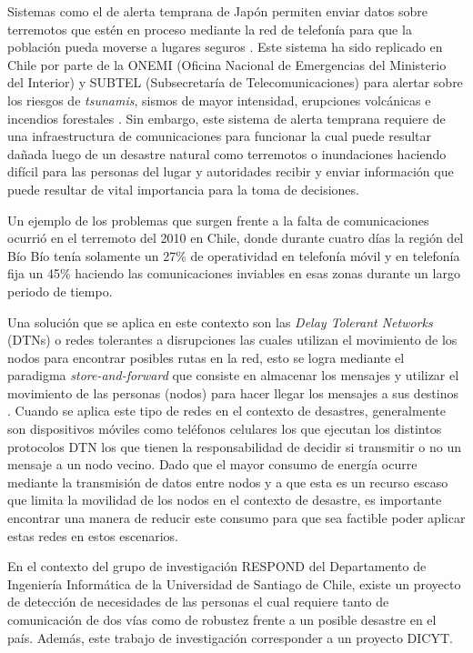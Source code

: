

Sistemas como el de alerta temprana de Japón permiten enviar datos sobre
terremotos que estén en proceso mediante la red de telefonía para que la
población pueda moverse a lugares seguros \cite{erika_yamasaki_what_2012}. Este
sistema ha sido replicado en Chile por parte de la ONEMI (Oficina Nacional de
Emergencias del Ministerio del Interior) y SUBTEL (Subsecretaría de
Telecomunicaciones) para alertar sobre los riesgos de \textit{tsunamis}, sismos
de mayor intensidad, erupciones volcánicas e incendios forestales
\cite{gobierno_de_chile_sistema_????, subtel_onemi_2014}.  Sin embargo, este
sistema de alerta temprana requiere de una infraestructura de comunicaciones
para funcionar la cual puede resultar dañada luego de un desastre natural como
terremotos o inundaciones haciendo difícil para las personas del lugar y
autoridades recibir y enviar información que puede resultar de vital importancia
para la toma de decisiones.

Un ejemplo de los problemas que surgen frente a la falta de comunicaciones
ocurrió en el terremoto del 2010 en Chile, donde durante cuatro días la región
del Bío Bío tenía solamente un 27\% de operatividad en telefonía móvil y en
telefonía fija un 45\%  \cite{subtel_reporte_2015} haciendo las comunicaciones
inviables en esas zonas durante un largo periodo de tiempo.


Una solución que se aplica en este contexto son las \textit{Delay Tolerant
Networks} (DTNs) o redes tolerantes a disrupciones las cuales utilizan el
movimiento de los nodos para encontrar posibles rutas en la red, esto se logra
mediante el paradigma \textit{store-and-forward}  que consiste en almacenar los
mensajes y utilizar el movimiento de las personas (nodos) para hacer llegar los
mensajes a sus destinos \cite{fall_delay-tolerant_2003}. Cuando se aplica este
tipo de redes en el contexto de desastres, generalmente son dispositivos móviles
como teléfonos celulares los que ejecutan los distintos protocolos DTN los que
tienen la responsabilidad de decidir si transmitir o no un mensaje a un nodo
vecino.  Dado que el mayor consumo de energía ocurre mediante la transmisión de
datos entre nodos y a que esta es un recurso escaso que limita la movilidad  de
los nodos en el contexto de desastre, es importante encontrar una manera de
reducir este consumo para que sea factible poder aplicar estas redes en estos
escenarios.

En el contexto del grupo de investigación RESPOND del Departamento de Ingeniería
Informática de la Universidad de Santiago de Chile, existe un proyecto de
detección de necesidades de las personas el cual requiere tanto de comunicación
de dos vías como de robustez frente a un posible desastre en el país. Además,
este trabajo de investigación corresponder a un proyecto DICYT.



